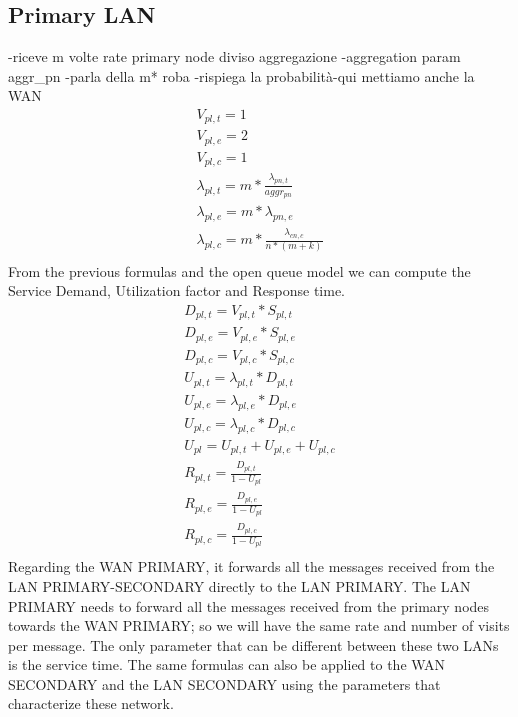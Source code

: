 \documentclass[11pt]{article}
\begin{document}
\subsection{Primary LAN}
-riceve m volte rate primary node diviso aggregazione
-aggregation param aggr\_pn
-parla della m* roba
-rispiega la probabilità-qui mettiamo anche la WAN
\begin{equation}
    \begin{array}{l}
        V_{pl, t} = 1 \\
        V_{pl, e} = 2 \\ %
        V_{pl,c} = 1 \\
        \lambda_{pl, t} = m*\frac{\lambda_{pn, t}}{aggr_{pn}} \\
        \lambda_{pl, e} = m*\lambda_{pn, e} \\
        \lambda_{pl, c} = m*\frac{\lambda_{cn, c}}{n*(m+k)}  \\\
    \end{array}
\end{equation}
From the previous formulas and the open queue model we can compute the Service Demand, Utilization factor and Response time.
\begin{equation}
    \begin{array}{l}
        D_{pl, t} = V_{pl, t} * S_{pl, t} \\
        D_{pl, e} = V_{pl, e} * S_{pl, e} \\
        D_{pl, c} = V_{pl, c} * S_{pl, c} \\
        U_{pl, t} = \lambda_{pl, t} * D_{pl, t} \\
        U_{pl, e} = \lambda_{pl, e} * D_{pl, e} \\
        U_{pl, c} = \lambda_{pl, c} * D_{pl, c} \\
        U_{pl} = U_{pl, t} + U_{pl, e} + U_{pl, c} \\
        R_{pl, t} = \frac{D_{pl, t}}{1 - U_{pl}} \\
        R_{pl, e} = \frac{D_{pl, e}}{1 - U_{pl}} \\
        R_{pl, c} = \frac{D_{pl, c}}{1 - U_{pl}} \\
    \end{array}
\end{equation}
Regarding the WAN PRIMARY, it forwards all the messages received from the LAN PRIMARY-SECONDARY directly to the LAN PRIMARY. The LAN PRIMARY needs to forward all the messages received from the primary nodes towards the WAN PRIMARY; so we will have the same rate and number of visits per message. The only parameter that can be different between these two LANs is the service time.
The same formulas can also be applied to the WAN SECONDARY and the LAN SECONDARY using the parameters that characterize these network.
\end{document}
